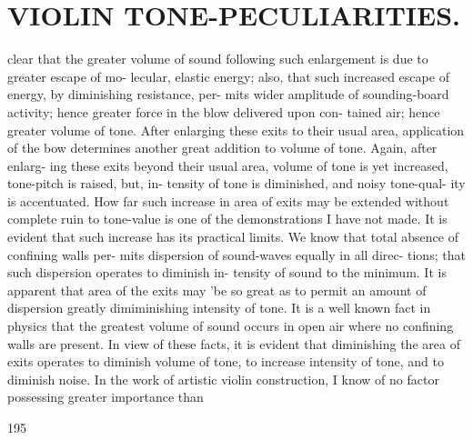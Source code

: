 \documentclass{article}
\begin{document}
\section*{VIOLIN TONE-PECULIARITIES.}
clear that the greater volume of sound following such enlargement is due to greater escape of mo- lecular, elastic energy; also, that such increased escape of energy, by diminishing resistance, per- mits wider amplitude of sounding-board activity; hence greater force in the blow delivered upon con- tained air; hence greater volume of tone. After enlarging these exits to their usual area, application of the bow determines another great addition to volume of tone. Again, after enlarg- ing these exits beyond their usual area, volume of tone is yet increased, tone-pitch is raised, but, in- tensity of tone is diminished, and noisy tone-qual- ity is accentuated. How far such increase in area of exits may be extended without complete ruin to tone-value is one of the demonstrations I have not made. It is evident that such increase has its practical limits. We know that total absence of confining walls per- mits dispersion of sound-waves equally in all direc- tions; that such dispersion operates to diminish in- tensity of sound to the minimum. It is apparent that area of the exits may 'be so great as to permit an amount of dispersion greatly dimiminishing intensity of tone. It is a well known fact in physics that the greatest volume of sound occurs in open air where no confining walls are present. In view of these facts, it is evident that diminishing the area of exits operates to diminish volume of tone, to increase intensity of tone, and to diminish noise. In the work of artistic violin construction, I know of no factor possessing greater importance than

195
\end{document}
